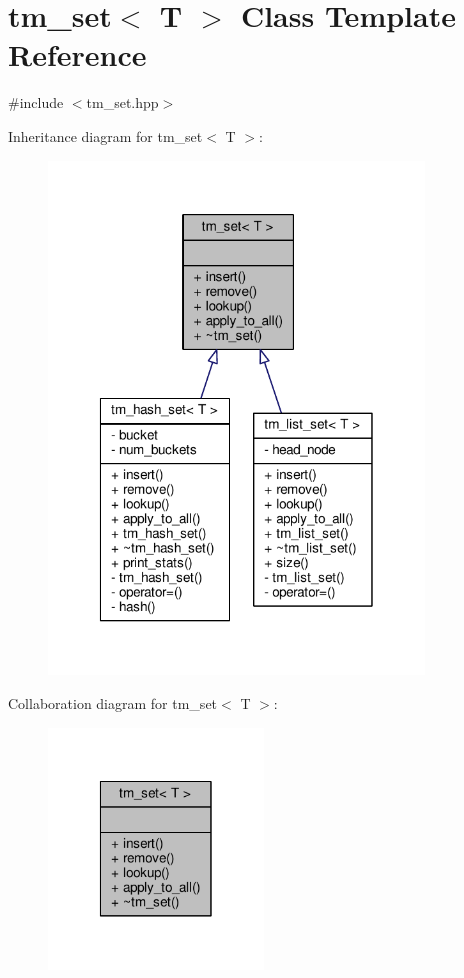 \hypertarget{classtm__set}{\section{tm\-\_\-set$<$ T $>$ Class Template Reference}
\label{classtm__set}
}


{\ttfamily \#include $<$tm\-\_\-set.\-hpp$>$}



Inheritance diagram for tm\-\_\-set$<$ T $>$\-:
\nopagebreak
\begin{figure}[H]
\begin{center}
\leavevmode
\includegraphics[width=283pt]{classtm__set__inherit__graph}
\end{center}
\end{figure}


Collaboration diagram for tm\-\_\-set$<$ T $>$\-:
\nopagebreak
\begin{figure}[H]
\begin{center}
\leavevmode
\includegraphics[width=162pt]{classtm__set__coll__graph}
\end{center}
\end{figure}
